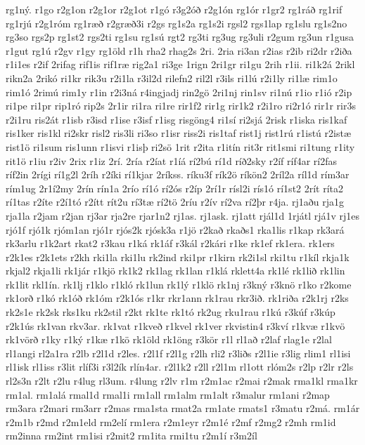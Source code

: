 {rg1ný.
r1go
r2g1on
r2g1or
r2g1ot
r1gó
r3g2óð
r2g1ón
rg1ór
r1gr2
rg1ráð
rg1rif
rg1rjú
r2g1róm
rg1ræð
r2græð3i
r2gs
rg1s2a
rg1s2i
rgsl2
rgs1lap
rg1slu
rg1s2no
rg3so
rgs2p
rg1st2
rgs2ti
rg1su
rg1sú
rgt2
rg3ti
rg3ug
rg3uli
r2gum
rg3un
r1gusa
r1gut
rg1ú
r2gv
r1gy
rg1öld
r1h
rha2
rhag2s
2ri.
2ria
ri3an
r2ias
r2ib
ri2dr
r2iða
r1i1es
r2if
2rifag
rif1is
rif1ræ
rig2a1
ri3ge
1rign
2ri1gr
ri1gu
2rih
r1ii.
ri1k2á
2rikl
rikn2a
2rikó
ri1kr
rik3u
r2i1la
r3il2d
rilefn2
ril2l
r3ils
ri1lú
r2i1ly
ri1læ
rim1o
rim1ó
2rimú
rim1y
r1in
r2i3ná
r4ingjadj
rin2gö
2ri1nj
rin1sv
ri1nú
r1io
r1ió
r2ip
ri1pe
ri1pr
rip1ró
rip2s
2r1ir
ri1ra
ri1re
rir1f2
rir1g
rir1k2
r2i1ro
ri2r1ó
rir1r
rir3s
r2i1ru
ris2át
r1isb
r3isd
r1ise
r3isf
r1isg
risgöng4
ri1sí
ri2sjá
2risk
r1iska
ris1kaf
ris1ker
ris1kl
ri2skr
risl2
ris3li
ri3so
r1isr
riss2i
ris1taf
rist1j
rist1rú
r1istú
r2istæ
rist1ö
ri1sum
ris1unn
r1isvi
r1isþ
ri2sö
1rit
r2ita
r1itín
rit3r
rit1smi
ri1tung
r1ity
rit1ö
r1iu
r2iv
2rix
r1iz
2rí.
2ría
r2íat
r1íá
rí2bú
rí1d
ríð2sky
r2íf
ríf4ar
rí2fas
ríf2in
2rígi
rí1g2l
2ríh
r2íki
rí1kjar
2ríkss.
ríku3f
rík2ö
ríkön2
2ríl2a
ríl1d
rím3ar
rím1ug
2r1í2my
2rín
rín1a
2río
rí1ó
rí2ós
r2íp
2rí1r
rísl2i
rís1ó
rí1st2
2rít
ríta2
rí1tas
r2íte
r2í1tó
r2ítt
rít2u
rí3tæ
rí2tö
2ríu
r2ív
rí2va
rí2þr
r4ja.
rj1aðu
rja1g
rja1la
r2jam
r2jan
rj3ar
rja2re
rjar1n2
rj1as.
rj1ask.
rj1att
rjál1d
1rjátl
rjá1v
rj1es
rjó1f
rjó1k
rjóm1an
rjó1r
rjós2k
rjósk3a
r1jö
r2kað
rkaðs1
rka1lis
r1kap
rk3ará
rk3arlu
r1k2art
rkat2
r3kau
r1ká
rk1áf
r3kál
r2kári
r1ke
rk1ef
rk1era.
rk1ers
r2k1es
r2k1ets
r2kh
rki1la
rki1lu
rk2ind
rki1pr
r1kirn
rk2i1sl
rki1tu
r1kíl
rkja1k
rkjal2
rkja1li
rk1jár
r1kjö
rk1k2
rk1lag
rk1lan
r1klá
rklett4a
rk1lé
rk1lið
rk1lin
rk1lit
rkl1ín.
rk1lj
r1klo
r1kló
rk1lun
rk1lý
r1klö
rk1nj
r3kný
r3knö
r1ko
r2kome
rk1orð
r1kó
rk1óð
rk1óm
r2k1ós
r1kr
rkr1ann
rk1rau
rkr3ið.
rk1riða
r2k1rj
r2ks
rk2s1e
rk2sk
rks1ku
rk2stil
r2kt
rk1te
rk1tó
rk2ug
rku1rau
r1kú
r3kúf
r3kúp
r2k1ús
rk1van
rkv3ar.
rk1vat
r1kveð
r1kvel
rk1ver
rkvistin4
r3kví
r1kvæ
r1kvö
rk1vörð
r1ky
r1ký
r1kæ
r1kö
rk1öld
rk1öng
r3kör
r1l
rl1að
r2laf
rlag1e
r2lal
rl1angi
rl2a1ra
r2lb
r2l1d
r2les.
r2l1f
r2l1g
r2lh
rli2
r3liðs
r2l1ie
r3lig
rlim1
rl1isi
rl1isk
rl1iss
r3lit
rlíf3i
r3l2ík
rlín4ar.
r2l1k2
r2ll
r2l1m
rl1ott
rlóm2s
r2lp
r2lr
r2ls
rl2s3n
r2lt
r2lu
r4lug
rl3um.
r4lung
r2lv
r1m
r2m1ac
r2mai
r2mak
rma1kl
rma1kr
rm1al.
rm1alá
rmal1d
rmal1i
rm1all
rm1alm
rm1alt
r3malur
rm1ani
r2map
rm3ara
r2mari
rm3arr
r2mas
rma1sta
rmat2a
rm1ate
rmats1
r3matu
r2má.
rm1ár
r2m1b
r2md
r2m1eld
rm2elí
rm1era
r2m1eyr
r2m1é
r2mf
r2mg2
r2mh
rm1id
rm2inna
rm2int
rm1isi
r2mit2
rm1ita
rmi1tu
r2m1í
r3m2íl
}
